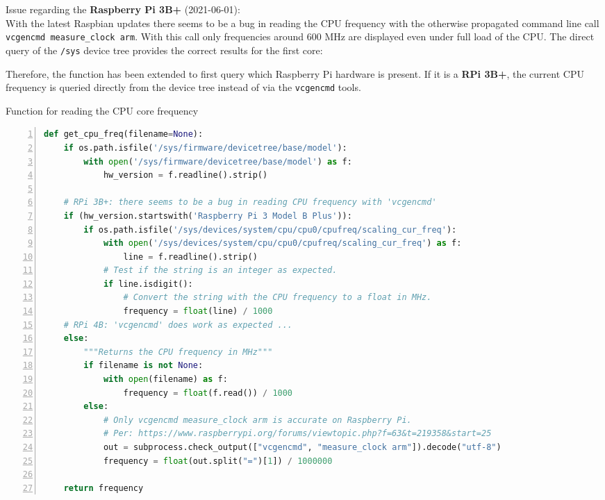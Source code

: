 \documentclass[10pt,parskip=half,
toc=sectionentrywithdots,
bibliography=totocnumbered,
captions=tableheading,numbers=noendperiod]{scrartcl}
\newenvironment{Shaded}{}{}
\newcommand{\NormalTok}[1]{{#1}}
\newcommand{\ExtensionTok}[1]{{#1}}
\begin{document}
Issue regarding the \textbf{Raspberry Pi 3B+} (2021-06-01):\\
With the latest Raspbian updates there seems to be a bug in reading the
CPU frequency with the otherwise propagated command line call
\texttt{vcgencmd\ measure\_clock\ arm}. With this call only frequencies
around 600 MHz are displayed even under full load of the CPU. The direct
query of the \texttt{/sys} device tree provides the correct results for
the first core:

\begin{mdframed}

\begin{Shaded}
\end{Shaded}

\end{mdframed}

Therefore, the function has been extended to first query which Raspberry
Pi hardware is present. If it is a \textbf{RPi 3B+}, the current CPU
frequency is queried directly from the device tree instead of via the
\texttt{vcgencmd} tools.

\begin{codecell}[H]
\caption{Function for reading the CPU core frequency}
\label{code:f_get_cpu_freq}
\begin{lstlisting}[language=Python,numbers=left,xleftmargin=20pt,xrightmargin=5pt,belowskip=5pt,aboveskip=5pt]
def get_cpu_freq(filename=None):
    if os.path.isfile('/sys/firmware/devicetree/base/model'):
        with open('/sys/firmware/devicetree/base/model') as f:
            hw_version = f.readline().strip()

    # RPi 3B+: there seems to be a bug in reading CPU frequency with 'vcgencmd'
    if (hw_version.startswith('Raspberry Pi 3 Model B Plus')):
        if os.path.isfile('/sys/devices/system/cpu/cpu0/cpufreq/scaling_cur_freq'):
            with open('/sys/devices/system/cpu/cpu0/cpufreq/scaling_cur_freq') as f:
                line = f.readline().strip()
            # Test if the string is an integer as expected.
            if line.isdigit():
                # Convert the string with the CPU frequency to a float in MHz.
                frequency = float(line) / 1000
    # RPi 4B: 'vcgencmd' does work as expected ...
    else:
        """Returns the CPU frequency in MHz"""
        if filename is not None:
            with open(filename) as f:
                frequency = float(f.read()) / 1000
        else:
            # Only vcgencmd measure_clock arm is accurate on Raspberry Pi.
            # Per: https://www.raspberrypi.org/forums/viewtopic.php?f=63&t=219358&start=25
            out = subprocess.check_output(["vcgencmd", "measure_clock arm"]).decode("utf-8")
            frequency = float(out.split("=")[1]) / 1000000

    return frequency
\end{lstlisting}\end{codecell}
\end{document}
